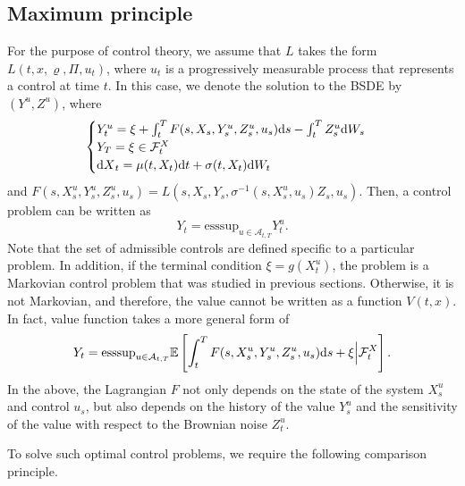 \documentclass[11pt]{book}
\newcommand{\dt}{\text{\normalfont d}t}
\newcommand{\ds}{\text{\normalfont d}s}
\newcommand{\dX}{\text{\normalfont d}X}
\newcommand{\dW}{\text{\normalfont d}W}
\begin{document}
\subsection{Maximum principle}\label{sec:max_principle}
For the purpose of control theory, we assume that $L$ takes the form $L(t,x,\varrho,\Pi,u_t)$, where $u_t$ is a progressively measurable process that represents a control at time $t$.
In this case, we denote the solution to the BSDE by $(Y^u,Z^u)$, where  
\begin{equation}
\begin{cases}
Y^u_t=\xi+\int_t^TF(s,X_s,Y^u_s,Z^u_s,u_s){{\ds}}-\int_t^TZ^u_s\dW_s\\
Y_T=\xi\in\mathcal{F}^{X}_t\\
{\dX}_t=\mu(t,X_t){{\dt}}+\sigma(t,X_t)\dW_t
\end{cases}
\end{equation}
and $F(s,X^u_s,Y^u_s,Z^u_s,u_s)=L(s,X_s,Y_s,\sigma^{-1}(s,X^u_s,u_s)Z_s,u_s)$.
Then, a control problem can be written as 
\begin{equation}
Y_t=\mathrm{esssup}_{u\in\mathcal{A}_{t,T}}Y_t^u.
\end{equation}
Note that the set of admissible controls are defined specific to a particular problem. In addition, if the terminal condition $\xi=g(X_t^u)$, the problem is a Markovian control problem that was studied in previous sections. Otherwise, it is not Markovian, and therefore, the value  cannot be written as a function $V(t,x)$. In fact, value function takes a more general form of 
\begin{equation}
Y_t=\mathrm{esssup}_{u\in\mathcal{A}_{t,T}}\mathbb{E}\left[\int_t^TF(s,X^u_s,Y^u_s,Z^u_s,u_s){{\ds}}+\xi\Big|\mathcal{F}^X_t\right].
\end{equation}
In the above, the Lagrangian $F$ not only depends on the state of the system $X_s^u$ and control $u_s$, but also depends on the history of the value $Y^u_s$ and the sensitivity of the value with respect to the Brownian noise $Z^u_t$.


To solve such optimal control problems, we require the following comparison principle.
\end{document}
